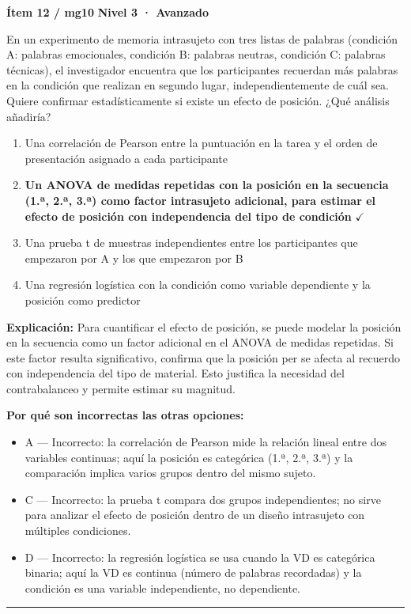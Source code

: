 \documentclass[12pt,a4paper]{article}
\begin{document}
\begin{mdframed}[backgroundcolor=fondogris,linecolor=rojo,linewidth=1pt,innerleftmargin=10pt,innerrightmargin=10pt,innertopmargin=7pt,innerbottommargin=7pt]
\textbf{Ítem 12 / mg10} \hfill {\small\bfseries\color{rojo} Nivel 3 · Avanzado}
\end{mdframed}

En un experimento de memoria intrasujeto con tres listas de palabras (condición A: palabras emocionales, condición B: palabras neutras, condición C: palabras técnicas), el investigador encuentra que los participantes recuerdan más palabras en la condición que realizan en segundo lugar, independientemente de cuál sea. Quiere confirmar estadísticamente si existe un efecto de posición. ¿Qué análisis añadiría?

\begin{enumerate}
  \item[A.] Una correlación de Pearson entre la puntuación en la tarea y el orden de presentación asignado a cada participante
  \item[\textbf{\color{verde}B.}] \textbf{\color{verde} Un ANOVA de medidas repetidas con la posición en la secuencia (1.ª, 2.ª, 3.ª) como factor intrasujeto adicional, para estimar el efecto de posición con independencia del tipo de condición} \hfill $\checkmark$
  \item[C.] Una prueba t de muestras independientes entre los participantes que empezaron por A y los que empezaron por B
  \item[D.] Una regresión logística con la condición como variable dependiente y la posición como predictor
\end{enumerate}

\noindent\textbf{\color{azul}Explicación:} Para cuantificar el efecto de posición, se puede modelar la posición en la secuencia como un factor adicional en el ANOVA de medidas repetidas. Si este factor resulta significativo, confirma que la posición per se afecta al recuerdo con independencia del tipo de material. Esto justifica la necesidad del contrabalanceo y permite estimar su magnitud.

\noindent\textbf{\color{gris}Por qué son incorrectas las otras opciones:}
\begin{itemize}
  \item {\small A — Incorrecto: la correlación de Pearson mide la relación lineal entre dos variables continuas; aquí la posición es categórica (1.ª, 2.ª, 3.ª) y la comparación implica varios grupos dentro del mismo sujeto.}
  \item {\small C — Incorrecto: la prueba t compara dos grupos independientes; no sirve para analizar el efecto de posición dentro de un diseño intrasujeto con múltiples condiciones.}
  \item {\small D — Incorrecto: la regresión logística se usa cuando la VD es categórica binaria; aquí la VD es continua (número de palabras recordadas) y la condición es una variable independiente, no dependiente.}
\end{itemize}
\vspace{8pt}\hrule\vspace{10pt}
\end{document}

